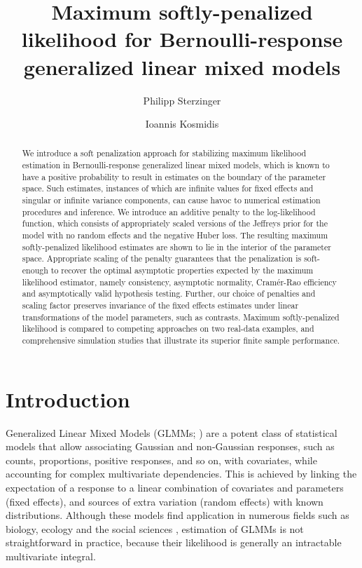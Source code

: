 \documentclass[11pt, a4paper]{article}
\title{Maximum softly-penalized likelihood for Bernoulli-response generalized linear mixed models}
\author[1]{Philipp Sterzinger}
\author[1,2]{Ioannis Kosmidis}
\affil[1]{Department of Statistics, University of Warwick, Coventry, CV4 7AL, UK}
\affil[2]{The Alan Turing Institute, London, NW1 2DB, UK}
\theoremstyle{example} \newtheorem{example}{Example}[section]
\theoremstyle{theorem} \newtheorem{theorem}{Theorem}[section]
\begin{document}
\maketitle

\begin{abstract}
  We introduce a soft penalization approach for stabilizing maximum
  likelihood estimation in Bernoulli-response generalized linear mixed
  models, which is known to have a positive probability to result in
  estimates on the boundary of the parameter space. Such estimates, instances of which
  are infinite values for fixed effects and singular or
  infinite variance components, can cause havoc to numerical
  estimation procedures and inference. We introduce an additive penalty to the log-likelihood function, 
  which consists of appropriately scaled versions of the Jeffreys
  prior for the model with no random effects and the negative Huber loss. The resulting maximum softly-penalized likelihood
  estimates are shown to lie in the interior of the parameter
  space. Appropriate scaling of the penalty guarantees that the penalization is soft-enough to recover
  the optimal asymptotic properties expected by the maximum likelihood
  estimator, namely consistency, asymptotic normality,
  Cram\'{e}r-Rao efficiency and asymptotically valid hypothesis testing. Further, our choice of penalties and scaling factor preserves invariance of the fixed effects estimates under linear transformations of the model
  parameters, such as contrasts. Maximum softly-penalized likelihood
  is compared to competing approaches on two real-data examples,
  and comprehensive simulation studies that illustrate its superior finite sample
  performance.
  \bigskip \\
\end{abstract}

\section{Introduction}
\label{sec:intro}

Generalized Linear Mixed Models (GLMMs; \citealt[Chapter
7]{mcculloch+etal:2008}) are a potent class of statistical models
that allow associating Gaussian and non-Gaussian responses, such as
counts, proportions, positive responses, and so on, with covariates,
while accounting for complex multivariate dependencies. This is achieved by linking
the expectation of a response to a linear combination of covariates
and parameters (fixed effects), and sources of extra variation (random
effects) with known distributions. Although these models find
application in numerous fields such as biology, ecology and the social
sciences \citep{bolker+etal:2009}, estimation of GLMMs is not
straightforward in practice, because their likelihood is generally an intractable
multivariate integral.
\end{document}
